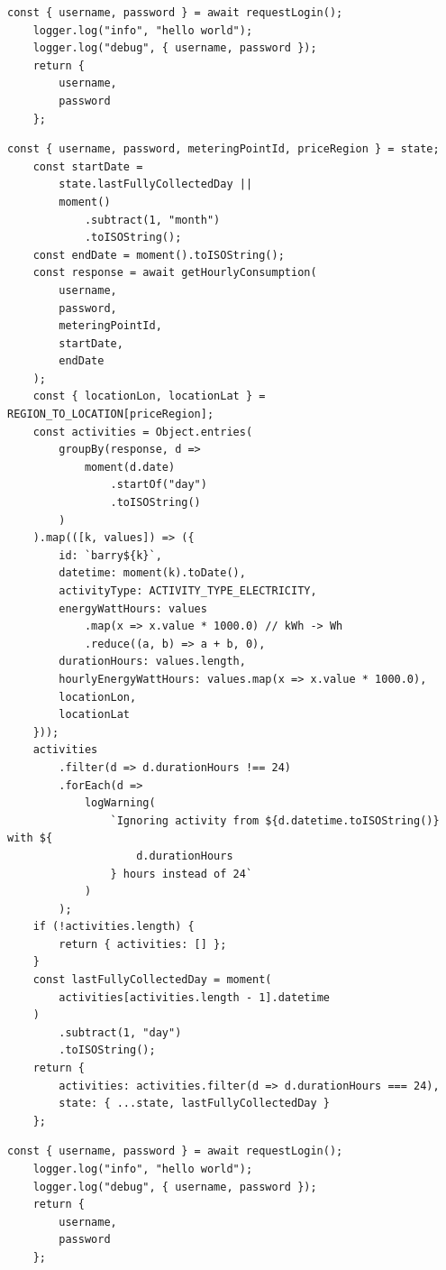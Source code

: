 \documentclass[jou,apacite]{apa6}
\begin{document}
\begin{lstlisting}[caption=Comparison 10a - A comparison of the template connect against barry.js's connect]
const { username, password } = await requestLogin();
	logger.log("info", "hello world");
	logger.log("debug", { username, password });
	return {
		username,
		password
	};
\end{lstlisting}

\begin{lstlisting}[caption=Comparison 10b - A comparison of the template connect against barry.js's connect]
const { username, password, meteringPointId, priceRegion } = state;
	const startDate =
		state.lastFullyCollectedDay ||
		moment()
			.subtract(1, "month")
			.toISOString();
	const endDate = moment().toISOString();
	const response = await getHourlyConsumption(
		username,
		password,
		meteringPointId,
		startDate,
		endDate
	);
	const { locationLon, locationLat } = REGION_TO_LOCATION[priceRegion];
	const activities = Object.entries(
		groupBy(response, d =>
			moment(d.date)
				.startOf("day")
				.toISOString()
		)
	).map(([k, values]) => ({
		id: `barry${k}`,
		datetime: moment(k).toDate(),
		activityType: ACTIVITY_TYPE_ELECTRICITY,
		energyWattHours: values
			.map(x => x.value * 1000.0) // kWh -> Wh
			.reduce((a, b) => a + b, 0),
		durationHours: values.length,
		hourlyEnergyWattHours: values.map(x => x.value * 1000.0),
		locationLon,
		locationLat
	}));
	activities
		.filter(d => d.durationHours !== 24)
		.forEach(d =>
			logWarning(
				`Ignoring activity from ${d.datetime.toISOString()} with ${
					d.durationHours
				} hours instead of 24`
			)
		);
	if (!activities.length) {
		return { activities: [] };
	}
	const lastFullyCollectedDay = moment(
		activities[activities.length - 1].datetime
	)
		.subtract(1, "day")
		.toISOString();
	return {
		activities: activities.filter(d => d.durationHours === 24),
		state: { ...state, lastFullyCollectedDay }
	};
\end{lstlisting}

\begin{lstlisting}[caption=Comparison 11a - Template connect against rejsekort.js's logIn Method]
	const { username, password } = await requestLogin();
	logger.log("info", "hello world");
	logger.log("debug", { username, password });
	return {
		username,
		password
	};

\end{lstlisting}
\end{document}

